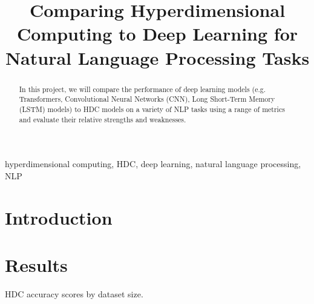 \documentclass[conference]{IEEEtran}
\begin{document}
\title{Comparing Hyperdimensional Computing to Deep Learning for Natural Language Processing Tasks}

\author{
\and
{}
}

\maketitle

\begin{abstract}
    In this project, we will compare the performance of deep learning models (e.g. Transformers, Convolutional Neural Networks (CNN), Long Short-Term Memory (LSTM) models) to HDC models on a variety of NLP tasks using a range of metrics and evaluate their relative strengths and weaknesses.
\end{abstract}

\begin{IEEEkeywords}
hyperdimensional computing, HDC, deep learning, natural language processing, NLP
\end{IEEEkeywords}

\section{Introduction}
\cite{BEIR}

\section{Results}

\begin{table}[htbp]
\caption{HDC accuracy scores by dataset size.}
\begin{center}
    
\end{center}
\label{tab:hdc_acc}
\end{table}





\end{document}
